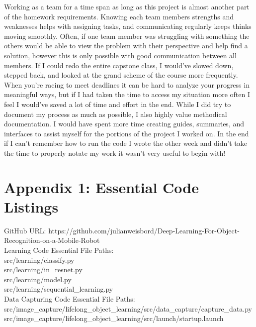 \documentclass[draftclsnofoot, onecolumn, 10pt, compsoc]{IEEEtran}
\begin{document}
   Working as a team for a time span as long as this project is almost another part of the homework requirements. Knowing each team members strengths and weaknesses helps with assigning tasks, and communicating regularly keeps thinks moving smoothly. Often, if one team member was struggling with something the others would be able to view the problem with their perspective and help find a solution, however this is only possible with good communication between all members. 
   If I could redo the entire capstone class, I would've slowed down, stepped back, and looked at the grand scheme of the course more frequently. When you're racing to meet deadlines it can be hard to analyze your progress in meaningful ways, but if I had taken the time to access my situation more often I feel I would've saved a lot of time and effort in the end. While I did try to document my process as much as possible, I also highly value methodical documentation. I would have spent more time creating guides, summaries, and interfaces to assist myself for the portions of the project I worked on. In the end if I can't remember how to run the code I wrote the other week and didn't take the time to properly notate my work it wasn't very useful to begin with! 
        

\section{Appendix 1: Essential Code Listings}
GitHub URL: https://github.com/julianweisbord/Deep-Learning-For-Object-Recognition-on-a-Mobile-Robot \\
Learning Code Essential File Paths: \\
\indent src/learning/classify.py \\
\indent src/learning/in\_resnet.py \\
\indent src/learning/model.py \\
\indent src/learning/sequential\_learning.py \\
Data Capturing Code Essential File Paths: \\
\indent src/image\_capture/lifelong\_object\_learning/src/data\_capture/capture\_data.py \\
\indent src/image\_capture/lifelong\_object\_learning/src/launch/startup.launch \\

%
%
\end{document}
